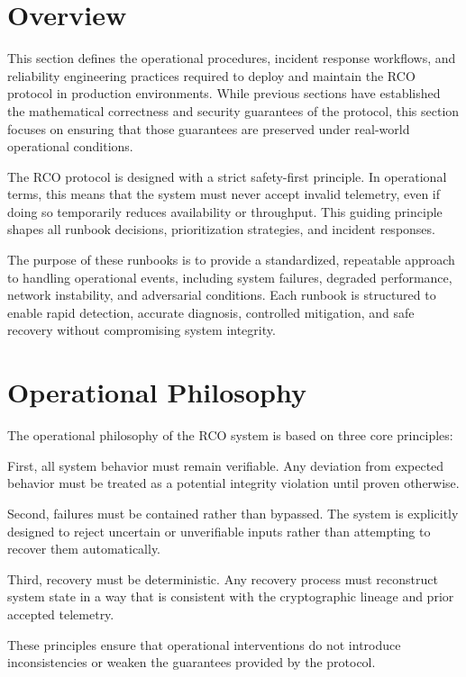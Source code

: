 \section{Overview}

This section defines the operational procedures, incident response workflows, and reliability engineering practices required to deploy and maintain the RCO protocol in production environments. While previous sections have established the mathematical correctness and security guarantees of the protocol, this section focuses on ensuring that those guarantees are preserved under real-world operational conditions.

The RCO protocol is designed with a strict safety-first principle. In operational terms, this means that the system must never accept invalid telemetry, even if doing so temporarily reduces availability or throughput. This guiding principle shapes all runbook decisions, prioritization strategies, and incident responses.

The purpose of these runbooks is to provide a standardized, repeatable approach to handling operational events, including system failures, degraded performance, network instability, and adversarial conditions. Each runbook is structured to enable rapid detection, accurate diagnosis, controlled mitigation, and safe recovery without compromising system integrity.

\section{Operational Philosophy}

The operational philosophy of the RCO system is based on three core principles:

First, all system behavior must remain verifiable. Any deviation from expected behavior must be treated as a potential integrity violation until proven otherwise.

Second, failures must be contained rather than bypassed. The system is explicitly designed to reject uncertain or unverifiable inputs rather than attempting to recover them automatically.

Third, recovery must be deterministic. Any recovery process must reconstruct system state in a way that is consistent with the cryptographic lineage and prior accepted telemetry.

These principles ensure that operational interventions do not introduce inconsistencies or weaken the guarantees provided by the protocol.

